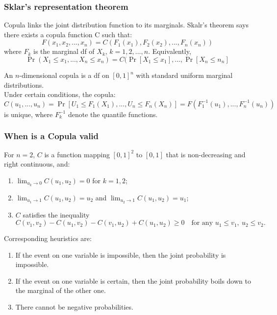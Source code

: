 \documentclass[11pt]{article}
\newcommand{\noi}{\noindent}
\begin{document}
\subsubsection{Sklar's representation theorem}
\noi Copula links the joint distribution function to its marginals. Skalr's theorem says there exists a copula function C such that:
$$F(x_1,x_2,...,x_n) = C(F_1(x_1),F_2(x_2),...,F_n(x_n))$$
\noi where $F_k$ is the marginal df of $X_k$, $k=1,2,...,n$. Equivalently,
$$\Pr(X_1\leq x_1, ..., X_n \leq x_n) = C(\Pr[X_1 \leq x_1],...,\Pr[X_n \leq n_n]$$

\noi An $n$-dimensional copula is a df on $[0,1]^n$ with standard uniform marginal distributions.\\
 
\noi Under certain conditions, the copula:
$$C(u_1,...,u_n) = \Pr[U_1 \leq F_1(X_1),..., U_n \leq F_n(X_n)] = F(F_1^{-1}(u_1),...,F_n^{-1}(u_n))$$
\noi is unique, where $F_k^{-1}$ denote the quantile functions.

\subsubsection{When is a Copula valid}
\noi For $n = 2$, $C$ is a function mapping $[0,1]^2$ to $[0,1]$ that is non-decreasing and right continuous, and:
\begin{enumerate}
    \item $\displaystyle \lim_{u_k\to 0}C(u_1,u_2)=0$ for $k=1,2$;
    \item $\displaystyle \lim_{u_1\to 1}C(u_1,u_2)=u_2$ and $\displaystyle \lim_{u_2\to 1}C(u_1,u_2)=u_1$;
    \item $C$ satisfies the inequality
    $$
        C(v_1,v_2)-C(u_1,v_2)-C(v_1,u_2)+C(u_1,u_2)\ge 0
        \quad\text{for any }u_1\le v_1,\ u_2\le v_2.
    $$
\end{enumerate}

\noi Corresponding heuristics are:
\begin{enumerate}
    \item If the event on one variable is impossible, then the joint probability is impossible.
    \item If the event on one variable is certain, then the joint probability boils down to the marginal of the other one.
    \item There cannot be negative probabilities.
\end{enumerate}
\end{document}
